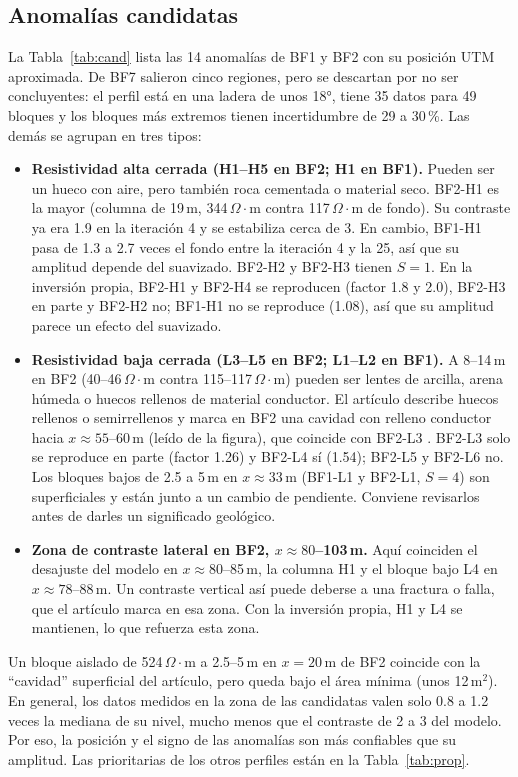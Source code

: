 \documentclass[conference]{IEEEtran}
\newcommand{\ohmm}{\ensuremath{\Omega\!\cdot\!\mathrm{m}}}
\begin{document}
\subsection{Anomal\'ias candidatas}
La Tabla~\ref{tab:cand} lista las 14 anomal\'ias de BF1 y BF2 con su posici\'on UTM aproximada. De BF7 salieron cinco regiones, pero se descartan por no ser concluyentes: el perfil est\'a en una ladera de unos 18°, tiene 35 datos para 49 bloques y los bloques m\'as extremos tienen incertidumbre de 29 a 30\,\%. Las dem\'as se agrupan en tres tipos:
\begin{itemize}
\item \textbf{Resistividad alta cerrada (H1--H5 en BF2; H1 en BF1).} Pueden ser un hueco con aire, pero tambi\'en roca cementada o material seco. BF2-H1 es la mayor (columna de 19\,m, 344\,\ohmm{} contra 117\,\ohmm{} de fondo). Su contraste ya era 1.9 en la iteraci\'on 4 y se estabiliza cerca de 3. En cambio, BF1-H1 pasa de 1.3 a 2.7 veces el fondo entre la iteraci\'on 4 y la 25, as\'i que su amplitud depende del suavizado. BF2-H2 y BF2-H3 tienen $S=1$. En la inversi\'on propia, BF2-H1 y BF2-H4 se reproducen (factor 1.8 y 2.0), BF2-H3 en parte y BF2-H2 no; BF1-H1 no se reproduce (1.08), as\'i que su amplitud parece un efecto del suavizado.
\item \textbf{Resistividad baja cerrada (L3--L5 en BF2; L1--L2 en BF1).} A 8--14\,m en BF2 (40--46\,\ohmm{} contra 115--117\,\ohmm) pueden ser lentes de arcilla, arena h\'umeda o huecos rellenos de material conductor. El art\'iculo describe huecos rellenos o semirrellenos y marca en BF2 una cavidad con relleno conductor hacia $x\approx 55$--60\,m (le\'ido de la figura), que coincide con BF2-L3 \cite{melouah2016}. BF2-L3 solo se reproduce en parte (factor 1.26) y BF2-L4 s\'i (1.54); BF2-L5 y BF2-L6 no. Los bloques bajos de 2.5 a 5\,m en $x\approx 33$\,m (BF1-L1 y BF2-L1, $S=4$) son superficiales y est\'an junto a un cambio de pendiente. Conviene revisarlos antes de darles un significado geol\'ogico.
\item \textbf{Zona de contraste lateral en BF2, $x\approx 80$--103\,m.} Aqu\'i coinciden el desajuste del modelo en $x\approx 80$--85\,m, la columna H1 y el bloque bajo L4 en $x\approx 78$--88\,m. Un contraste vertical as\'i puede deberse a una fractura o falla, que el art\'iculo marca en esa zona. Con la inversi\'on propia, H1 y L4 se mantienen, lo que refuerza esta zona.
\end{itemize}
Un bloque aislado de 524\,\ohmm{} a 2.5--5\,m en $x=20$\,m de BF2 coincide con la ``cavidad'' superficial del art\'iculo, pero queda bajo el \'area m\'inima (unos 12\,m$^2$). En general, los datos medidos en la zona de las candidatas valen solo 0.8 a 1.2 veces la mediana de su nivel, mucho menos que el contraste de 2 a 3 del modelo. Por eso, la posici\'on y el signo de las anomal\'ias son m\'as confiables que su amplitud. Las prioritarias de los otros perfiles est\'an en la Tabla~\ref{tab:prop}.
\end{document}
